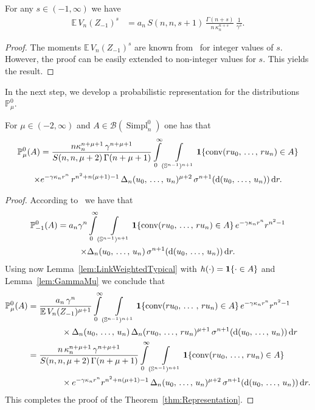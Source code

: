 \documentclass[AHL,Unicode,longabstracts,published]{cedram}
\newcommand{\Sp}{\mathbb S}
\newcommand{\EE}{\mathbb{E}\,}
\newcommand{\PP}{\mathbb{P}}
\newcommand{\dd}{{\rm d}}
\DeclareMathOperator{\Simpl}{Simpl}
\newcommand{\conv}{\mathop{\mathrm{conv}}\nolimits}
\begin{document}
\begin{lemm}\label{lem:GammaMu}
For any $s\in(-1,\infty)$ we have
\begin{align*}
\EE V_n(Z_{-1})^{s} &= a_n\,S(n,n,s+1)\,\frac{\Gamma(n+s)}{n\,\kappa_n^{n+s}}\,\frac{1}{\gamma^{s}}.
\end{align*}
\end{lemm}
\begin{proof}
The moments $\EE V_n(Z_{-1})^{s}$ are known from~\cite[Theorem~10.4.5]{SW08} for integer values of $s$. However, the proof can be easily extended to non-integer values for $s$. This yields the result.
\end{proof}

In the next step, we develop a probabilistic representation for the distributions $\PP_\mu^0$.

\begin{theo}\label{thm:Representation}
For $\mu\in(-2,\infty)$ and $A\in\mathcal{B}(\Simpl_n^0)$ one has that
\begin{multline*}
\PP_\mu^0(A) = \frac{n\kappa_n^{n+\mu+1}\,\gamma^{n+\mu+1}}{S(n,n,\mu+2)\,\Gamma(n+\mu+1)}\int\limits_0^\infty\int\limits_{(\Sp^{n-1})^{n+1}}{\bf 1}\{\conv(ru_0,\,\ldots,\,ru_n)\in A\}\\
\times e^{-\gamma\kappa_nr^n}\,r^{n^2+n(\mu+1)-1}\,\Delta_n(u_0,\,\ldots,\,u_n)^{\mu+2}\,\sigma^{n+1}(\dd(u_0,\,\ldots,\,u_n))\,\dd r.
\end{multline*}
\end{theo}


\begin{proof}
According to~\cite[Theorem~10.4.4]{SW08} we have that
\begin{multline*}
\PP_{-1}^0(A)
= a_n\gamma^n\int\limits_{0}^{\infty}\int\limits_{(\Sp^{n-1})^{n+1}}{\bf 1}\{\conv(ru_0,\,\ldots,\,ru_n)\in A\}\,e^{-\gamma\kappa_nr^n}r^{n^2-1}\\
\times\Delta_n(u_0,\,\ldots,\,u_n)\,\sigma^{n+1}(\dd(u_0,\,\ldots,\,u_n))\,\dd r.
\end{multline*}
Using now Lemma~\ref{lem:LinkWeightedTypical} with $h(\cdot)={\bf 1}\{\cdot\in A\}$ and Lemma~\ref{lem:GammaMu} we conclude that
\begin{align*}
\PP_{\mu}^0(A) &= \frac{a_n\,\gamma^n}{\EE V_n(Z_{-1})^{\mu+1}}\int\limits_{0}^{\infty}\int\limits_{(\Sp^{n-1})^{n+1}}{\bf 1}\{\conv(ru_0,\,\ldots\,,\,ru_n)\in A\}\,e^{-\gamma\kappa_nr^n}r^{n^2-1}\\
&\qquad\qquad\times\Delta_n(u_0,\,\ldots,\,u_n)\,\Delta_n(ru_0,\,\ldots,\,ru_n)^{\mu+1}\,\sigma^{n+1}(\dd(u_0,\,\ldots,\,u_n))\,\dd r\\
&=\frac{n\,\kappa_n^{n+\mu+1}\,\gamma^{n+\mu+1}}{S(n,n,\mu+2)\,\Gamma(n+\mu+1)}\int\limits_{0}^{\infty}\int\limits_{(\Sp^{n-1})^{n+1}}{\bf 1}\{\conv(ru_0,\,\ldots,\,ru_n)\in A\}\\
&\qquad\qquad\times e^{-\gamma\kappa_nr^n}r^{n^2+n(\mu+1)-1}\,\Delta_n(u_0,\,\ldots,\,u_n)^{\mu+2}\,\sigma^{n+1}(\dd(u_0,\,\ldots,\,u_n))\,\dd r.
\end{align*}
This completes the proof of the Theorem~\ref{thm:Representation}.
\end{proof}
\end{document}
